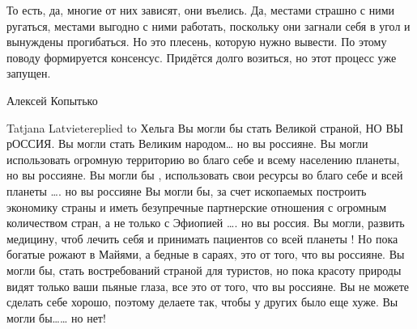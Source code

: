 То есть, да, многие от них зависят, они въелись. Да, местами страшно с ними ругаться, местами выгодно с ними работать, поскольку они загнали себя в угол и вынуждены прогибаться. Но это плесень, которую нужно вывести. По этому поводу формируется консенсус. Придётся долго возиться, но этот процесс уже запущен.

 Алексей Копытько


Tatjana Latvietereplied to Хельга
Вы могли бы стать Великой страной, НО ВЫ рОССИЯ.
Вы могли стать Великим народом… но вы россияне.
Вы могли использовать огромную территорию во благо себе и всему населению планеты, но вы россияне.
Вы могли бы , использовать свои ресурсы во благо себе и всей планеты …. но вы россияне
Вы могли бы, за счет ископаемых построить экономику страны и иметь безупречные партнерские отношения с огромным количеством стран, а не только с Эфиопией …. но вы россия.
Вы могли, развить медицину, чтоб лечить себя и принимать пациентов со всей планеты ! Но пока богатые рожают в Майями, а бедные в сараях, это от того, что вы россияне.
Вы могли бы, стать востребований страной для туристов, но пока красоту природы видят только ваши пьяные глаза, все это от того, что вы россияне.
Вы не можете сделать себе хорошо, поэтому делаете так, чтобы у других было еще хуже.
Вы могли бы…… но нет!
